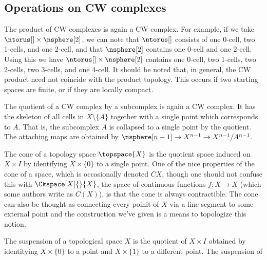 \documentclass{book}                                                           %
\begin{document}
            \subsection{Operations on CW complexes}
                The product of CW complexes is again a CW complex. For example,
                if we take $\ntorus[]\times\nsphere[2]$, we can note that
                $\ntorus[]$ consists of one 0-cell, two 1-cells, and one 2-cell,
                and that $\nsphere[2]$ contains one 0-cell and one 2-cell. Using
                this we have $\ntorus[]\times\nsphere[2]$ contains
                one 0-cell, two 1-cells, two 2-cells, two 3-cells, and one
                4-cell. It should be noted that, in general, the CW product need
                not coincide with the product topology. This occurs if two
                starting spaces are finite, or if they are locally compact.
                \par\hfill\par
                The quotient of a CW complex by a subcomplex is again a CW
                complex. It has the skeleton of all cells in $X\setminus\{A\}$
                together with a single point which corresponds to $A$. That is,
                the subcomplex $A$ is collapsed to a single point by the
                quotient. The attaching maps are obtained by
                $\nsphere[n-1]\rightarrow{X}^{n-1}\rightarrow{X}^{n-1}/A^{n-1}$.
                \par\hfill\par
                The cone of a topology space $\topspace{X}$ is the quotient
                space induced on $X\times{I}$ by identifying $X\times\{0\}$ to a
                single point. One of the nice properties of the cone of a space,
                which is occasionally denoted $CX$, though one should not
                confuse this with $\Ckspace[X]{}{X}$, the space of continuous
                functions $f:X\rightarrow{X}$ (which some authors write as
                $C(X)$), is that the cone is always contractible. The cone can
                also be thought as connecting every poinit of $X$ via a line
                segment to some external point and the construction we've given
                is a means to topologize this notion.
                \par\hfill\par
                The suspension of a topological space $X$ is the quotient of
                $X\times{I}$ obtained by identitying $X\times\{0\}$ to a point
                and $X\times\{1\}$ to a different point. The suspension of
\end{document}
